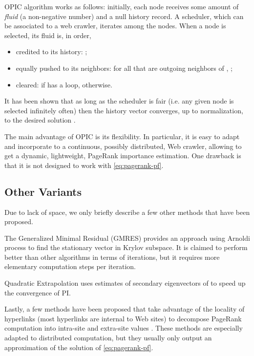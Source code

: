 \documentclass{llncs}
\begin{document}
OPIC algorithm works as follows: initially, each node receives some amount of \emph{fluid} (a non-negative number) and a null history record. A scheduler, which can be associated to a web crawler, iterates among the nodes. When a node  is selected, its fluid  is, in order,
\begin{itemize}
\item credited to its history: ;
\item equally pushed to its neighbors: for all  that are outgoing neighbors of , ;
\item cleared:  if  has a loop,  otherwise.
\end{itemize}

It has been shown that as long as the scheduler is fair (i.e. any given node is selected infinitely often) then the history vector converges, up to normalization, to the desired solution \cite{AP03}.

The main advantage of OPIC is its flexibility. In particular, it is easy to adapt and incorporate to a continuous, possibly distributed, Web crawler, allowing to get a dynamic, lightweight, PageRank importance estimation. One drawback is that it is not designed to work with \eqref{eq:pagerank-pf}.




\subsection{Other Variants}

Due to lack of space, we only briefly describe a few other methods that have been proposed.

The Generalized Minimal Residual (GMRES) \cite{SS86} provides an approach using Arnoldi process to find the stationary vector in Krylov subspace. It is claimed to perform better than other algorithms in terms of iterations, but it requires more elementary computation steps per iteration.

Quadratic Extrapolation \cite{CG03} uses estimates of secondary eigenvectors of  to speed up the convergence of PI.

Lastly, a few methods have been proposed that take advantage of the locality of hyperlinks (most hyperlinks are internal to Web sites) to decompose PageRank computation into intra-site and extra-site values \cite{WD04,blockrank,flowrank}. These methods are especially adapted to distributed computation, but they usually only output an approximation of the solution of \eqref{eq:pagerank-pf}.
\end{document}
